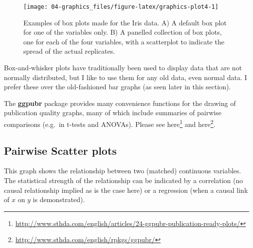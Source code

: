 \documentclass[english,10pt,a4paper,oneside]{book}
\renewcommand{\href}[2]{#2\footnote{\url{#1}}}
\let\rmarkdownfootnote\footnote%
\def\footnote{\protect\rmarkdownfootnote}
\theoremstyle{definition}
\theoremstyle{definition}
\theoremstyle{definition}
\theoremstyle{remark}
\begin{document}
\begin{figure}
\texttt{[image: 04-graphics\_files/figure-latex/graphics-plot4-1]} \caption{Examples of box plots made for the Iris data. A) A default box plot for one of the variables only. B) A panelled collection of box plots, one for each of the four variables, with a scatterplot to indicate the spread of the actual replicates.}\label{fig:graphics-plot4}
\end{figure}

Box-and-whisker plots have traditionally been used to display data that
are not normally distributed, but I like to use them for any old data,
even normal data. I prefer these over the old-fashioned bar graphs (as
seen later in this section).

The \textbf{ggpubr} package provides many convenience functions for the
drawing of publication quality graphs, many of which include summaries
of pairwise comparisons (e.g.~in t-tests and ANOVAs). Please see
\href{http://www.sthda.com/english/articles/24-ggpubr-publication-ready-plots/}{here}
and \href{http://www.sthda.com/english/rpkgs/ggpubr/}{here}.

\subsection{Pairwise Scatter plots}\label{pairwise-scatter-plots}

This graph shows the relationship between two (matched) continuous
variables. The statistical strength of the relationship can be indicated
by a correlation (no causal relationship implied as is the case here) or
a regression (when a causal link of \(x\) on \(y\) is demonstrated).
\end{document}
